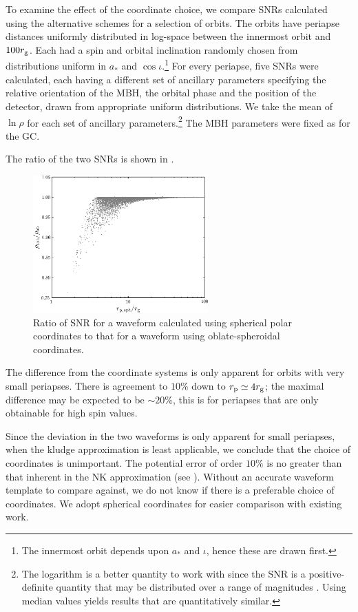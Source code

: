 To examine the effect of the coordinate choice, we compare SNRs calculated using the alternative schemes for a selection of orbits. The orbits have periapse distances uniformly distributed in log-space between the innermost orbit and $100 r_\mathrm{g}$. Each had a spin and orbital inclination randomly chosen from distributions uniform in $a_\ast$ and $\cos \iota$.\footnote{The innermost orbit depends upon $a_\ast$ and $\iota$, hence these are drawn first.} For every periapse, five SNRs were calculated, each having a different set of ancillary parameters specifying the relative orientation of the MBH, the orbital phase and the position of the detector, drawn from appropriate uniform distributions. We take the mean of $\ln \rho$ for each set of ancillary parameters.\footnote{The logarithm is a better quantity to work with since the SNR is a positive-definite quantity that may be distributed over a range of magnitudes \citep[sections 22.1, 23.3]{MacKay2003}. Using median values yields results that are quantitatively similar.} The MBH parameters were fixed as for the GC.

The ratio of the two SNRs is shown in .
\begin{figure}%
\begin{center}
 \includegraphics[width=0.6\textwidth]{./images/Fig_SNR_ratio}
 \caption{Ratio of SNR for a waveform calculated using spherical polar coordinates to that for a waveform using oblate-spheroidal coordinates.\label{fig:Oblate_sphere}}
   \end{center}
\end{figure}
The difference from the coordinate systems is only apparent for orbits with very small periapses. There is agreement to $10\%$ down to $r_\mathrm{p} \simeq 4 r_\mathrm{g}$; the maximal difference may be expected to be $\sim 20\%$, this is for periapses that are only obtainable for high spin values.

Since the deviation in the two waveforms is only apparent for small periapses, when the kludge approximation is least applicable, we conclude that the choice of coordinates is unimportant. The potential error of order $10\%$ is no greater than that inherent in the NK approximation (see ). Without an accurate waveform template to compare against, we do not know if there is a preferable choice of coordinates. We adopt spherical coordinates for easier comparison with existing work.

